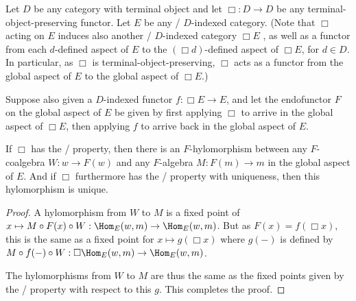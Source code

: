 \begin{theorem}\label{CoalgToAlg}
Let $D$ be any category with terminal object and let $\Box : D \to D$ be any terminal-object-preserving functor. Let $E$ be any \repsmall/ $D$-indexed category. (Note that $\Box$ acting on $E$ induces also another \repsmall/ $D$-indexed category $\Box E$ , as well as a functor from each $d$-defined aspect of $E$ to the $(\Box d)$-defined aspect of $\Box E$, for $d \in D$. In particular, as $\Box$ is terminal-object-preserving, $\Box$ acts as a functor from the global aspect of $E$ to the global aspect of $\Box E$.) 

Suppose also given a $D$-indexed functor $f : \Box E \to E$, and let the endofunctor $F$ on the global aspect of $E$ be given by first applying $\Box$ to arrive in the global aspect of $\Box E$, then applying $f$ to arrive back in the global aspect of $E$.

If $\Box$ has the \Loeb/ property, then there is an $F$-hylomorphism between any $F$-coalgebra $W : w \to F(w)$ and any $F$-algebra $M : F(m) \to m$ in the global aspect of $E$. And if $\Box$ furthermore has the \Loeb/ property with uniqueness, then this hylomorphism is unique.
\end{theorem}
\begin{proof}
A hylomorphism from $W$ to $M$ is a fixed point of $x \mapsto M \circ F(x) \circ W : \Hom_E(w, m) \to \Hom_E(w, m)$. But as $F(x) = f(\Box x)$, this is the same as a fixed point for $x \mapsto g(\Box x)$ where $g(-)$ is defined by $M \circ f(-) \circ W : \Box \Hom_E(w, m) \to \Hom_E(w, m)$. 

The hylomorphisms from $W$ to $M$ are thus the same as the fixed points given by the \Loeb/ property with respect to this $g$. This completes the proof.
\end{proof}

